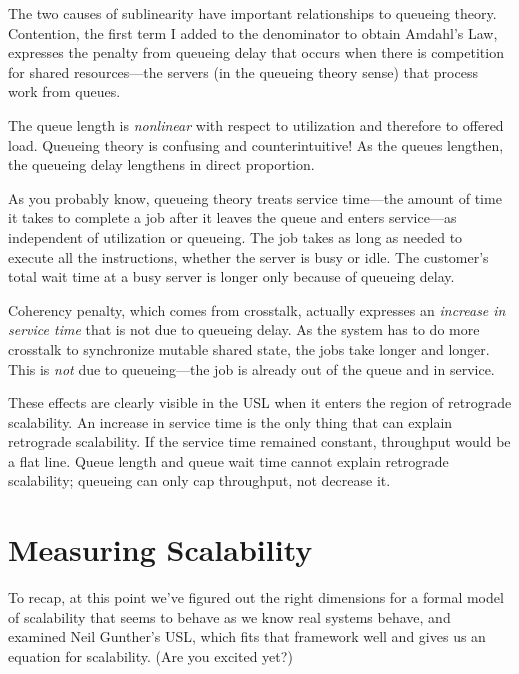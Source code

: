 \documentclass{vivid_layout}
\begin{document}
The two causes of sublinearity have important relationships to queueing theory.
Contention, the first term I added to the denominator to obtain Amdahl's Law,
expresses the penalty from queueing delay that occurs when there is competition
for shared resources---the servers (in the queueing theory sense) that process
work from queues.

The queue length is {\itshape nonlinear} with respect to utilization and
therefore to offered load. Queueing theory is confusing and counterintuitive! As
the queues lengthen, the queueing delay lengthens in direct proportion.

As you probably know, queueing theory treats service time---the amount of time
it takes to complete a job after it leaves the queue and enters service---as
independent of utilization or queueing. The job takes as long as needed to
execute all the instructions, whether the server is busy or idle. The customer's
total wait time at a busy server is longer only because of queueing delay.

Coherency penalty, which comes from crosstalk, actually expresses an {\itshape
increase in service time} that is not due to queueing delay. As the system has
to do more crosstalk to synchronize mutable shared state, the jobs take longer
and longer. This is {\itshape not} due to queueing---the job is already out of
the queue and in service.

These effects are clearly visible in the USL when it enters the region of
retrograde scalability. An increase in service time is the only thing that can
explain retrograde scalability. If the service time remained constant,
throughput would be a flat line. Queue length and queue wait time cannot explain
retrograde scalability; queueing can only cap throughput, not decrease it.


\newpage
\section{Measuring Scalability}

To recap, at this point we've figured out the right dimensions for a formal model
of scalability that seems to behave as we know real systems behave, and examined
Neil Gunther's USL, which fits that framework well and gives us an equation for
scalability. (Are you excited yet?)
\end{document}
